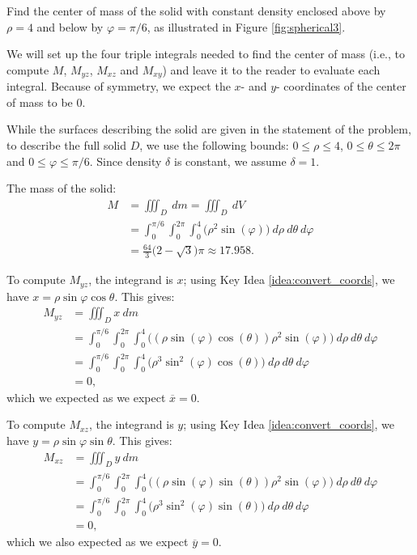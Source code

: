 {Find the center of mass of the solid with constant density enclosed above by $\rho=4$ and below by $\varphi = \pi/6$, as illustrated in Figure \ref{fig:spherical3}.
}
{We will set up the four triple integrals needed to find the center of mass (i.e., to compute $M$, $M_{yz}$, $M_{xz}$ and $M_{xy}$) and leave it to the reader to evaluate each integral. Because of symmetry, we expect the $x$- and $y$- coordinates of the center of mass to be 0.

While the surfaces describing the solid are given in the statement of the problem, to describe the full solid $D$, we use the following bounds: $0 \leq \rho \leq 4$, $0 \leq \theta \leq 2\pi$ and $0 \leq \varphi \leq \pi/6$. Since density $\delta$ is constant, we assume $\delta =1$.

The mass of the solid:
\begin{align*}
M &= \iiint_D\ dm = \iiint_D\ dV\\
	&= \int_0^{\pi/6}\int_0^{2\pi}\int_0^4\big(\rho^2\sin(\varphi)\big)\ d\rho\ d\theta\ d\varphi\\
	&= \frac{64}3\big(2-\sqrt{3}\big)\pi \approx 17.958.
\end{align*}

To compute $M_{yz}$, the integrand is $x$; using Key Idea \ref{idea:convert_coords}, we have $x = \rho\sin\varphi\cos\theta$. This gives:
\begin{align*}
M_{yz} &= \iiint_D x\ dm \\
	&= \int_0^{\pi/6}\int_0^{2\pi}\int_0^4 \big((\rho\sin(\varphi)\cos(\theta))\rho^2\sin(\varphi)\big) \ d\rho\ d\theta\ d\varphi\\
	&= \int_0^{\pi/6}\int_0^{2\pi}\int_0^4 \big(\rho^3\sin^2(\varphi)\cos(\theta)\big) \ d\rho\ d\theta\ d\varphi\\
	&=0,
\end{align*}
which we expected as we expect $\overline{x} = 0$.

To compute $M_{xz}$, the integrand is $y$; using Key Idea \ref{idea:convert_coords}, we have $y = \rho\sin\varphi\sin\theta$. This gives:
\begin{align*}
M_{xz} &= \iiint_D y\ dm \\
	&= \int_0^{\pi/6}\int_0^{2\pi}\int_0^4 \big((\rho\sin(\varphi)\sin(\theta))\rho^2\sin(\varphi)\big) \ d\rho\ d\theta\ d\varphi\\
	&= \int_0^{\pi/6}\int_0^{2\pi}\int_0^4 \big(\rho^3\sin^2(\varphi)\sin(\theta)\big) \ d\rho\ d\theta\ d\varphi\\
	&=0,
\end{align*}
which we also expected as we expect $\overline{y} = 0$.

}
